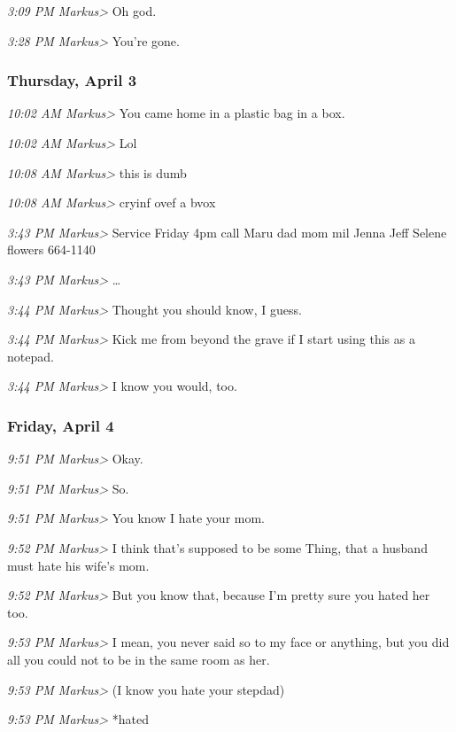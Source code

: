 {\emph{3:09 PM Markus\textgreater{}} Oh god.

\emph{3:28 PM Markus\textgreater{}} You're gone.

\subsubsection*{Thursday, April 3}\label{thursday-april-3}

\emph{10:02 AM Markus\textgreater{}} You came home in a plastic bag in a
box.

\emph{10:02 AM Markus\textgreater{}} Lol

\emph{10:08 AM Markus\textgreater{}} this is dumb

\emph{10:08 AM Markus\textgreater{}} cryinf ovef a bvox

\emph{3:43 PM Markus\textgreater{}} Service Friday 4pm call Maru dad mom
mil Jenna Jeff Selene flowers 664-1140

\emph{3:43 PM Markus\textgreater{}} \ldots{}

\emph{3:44 PM Markus\textgreater{}} Thought you should know, I guess.

\emph{3:44 PM Markus\textgreater{}} Kick me from beyond the grave if I
start using this as a notepad.

\emph{3:44 PM Markus\textgreater{}} I know you would, too.

\subsubsection*{Friday, April 4}\label{friday-april-4}

\emph{9:51 PM Markus\textgreater{}} Okay.

\emph{9:51 PM Markus\textgreater{}} So.

\emph{9:51 PM Markus\textgreater{}} You know I hate your mom.

\emph{9:52 PM Markus\textgreater{}} I think that's supposed to be some
Thing, that a husband must hate his wife's mom.

\emph{9:52 PM Markus\textgreater{}} But you know that, because I'm
pretty sure you hated her too.

\emph{9:53 PM Markus\textgreater{}} I mean, you never said so to my face
or anything, but you did all you could not to be in the same room as
her.

\emph{9:53 PM Markus\textgreater{}} (I know you hate your stepdad)

\emph{9:53 PM Markus\textgreater{}} *hated

}
